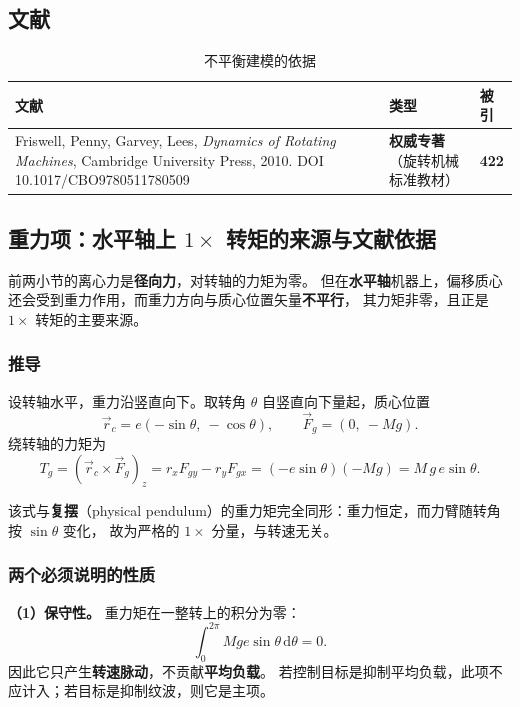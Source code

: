 \documentclass[11pt,a4paper]{ctexart}
\begin{document}
\subsection{文献}

\begin{table}[h]
\centering
\caption{不平衡建模的依据}
\begin{tabular}{@{}p{7.2cm}ll@{}}
\toprule
文献 & 类型 & 被引 \\
\midrule
Friswell, Penny, Garvey, Lees, \emph{Dynamics of Rotating Machines},
Cambridge University Press, 2010. DOI 10.1017/CBO9780511780509
& \textbf{权威专著}（旋转机械标准教材） & \textbf{422} \\
\bottomrule
\end{tabular}
\end{table}

\subsection{重力项：水平轴上 $1\times$ 转矩的来源与文献依据}
\label{sec:gravity}

前两小节的离心力是\textbf{径向力}，对转轴的力矩为零。
但在\textbf{水平轴}机器上，偏移质心还会受到重力作用，而重力方向与质心位置矢量\textbf{不平行}，
其力矩非零，且正是 $1\times$ 转矩的主要来源。

\subsubsection{推导}

设转轴水平，重力沿竖直向下。取转角 $\theta$ 自竖直向下量起，质心位置
\begin{equation}
\vec r_c=e\left(-\sin\theta,\ -\cos\theta\right),\qquad
\vec F_g=\left(0,\ -Mg\right).
\end{equation}
绕转轴的力矩为
\begin{equation}
T_g=\left(\vec r_c\times\vec F_g\right)_z
=r_xF_{gy}-r_yF_{gx}
=(-e\sin\theta)(-Mg)=M\,g\,e\sin\theta .
\end{equation}

该式与\textbf{复摆}（physical pendulum）的重力矩完全同形：重力恒定，而力臂随转角按 $\sin\theta$ 变化，
故为严格的 $1\times$ 分量，与转速无关。

\subsubsection{两个必须说明的性质}

\textbf{（1）保守性。} 重力矩在一整转上的积分为零：
\begin{equation}
\int_0^{2\pi}Mge\sin\theta\,\mathrm{d}\theta=0 .
\end{equation}
因此它只产生\textbf{转速脉动}，不贡献\textbf{平均负载}。
若控制目标是抑制平均负载，此项不应计入；若目标是抑制纹波，则它是主项。
\end{document}

